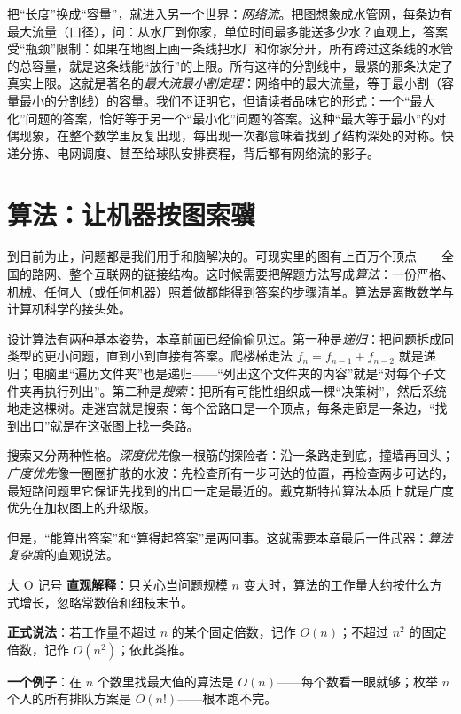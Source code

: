 把“长度”换成“容量”，就进入另一个世界：\emph{网络流}。把图想象成水管网，每条边有最大流量（口径），问：从水厂到你家，单位时间最多能送多少水？直观上，答案受“瓶颈”限制：如果在地图上画一条线把水厂和你家分开，所有跨过这条线的水管的总容量，就是这条线能“放行”的上限。所有这样的分割线中，最紧的那条决定了真实上限。这就是著名的\emph{最大流最小割定理}：网络中的最大流量，等于最小割（容量最小的分割线）的容量。我们不证明它，但请读者品味它的形式：一个“最大化”问题的答案，恰好等于另一个“最小化”问题的答案。这种“最大等于最小”的对偶现象，在整个数学里反复出现，每出现一次都意味着找到了结构深处的对称。快递分拣、电网调度、甚至给球队安排赛程，背后都有网络流的影子。

\section{算法：让机器按图索骥}

到目前为止，问题都是我们用手和脑解决的。可现实里的图有上百万个顶点——全国的路网、整个互联网的链接结构。这时候需要把解题方法写成\emph{算法}：一份严格、机械、任何人（或任何机器）照着做都能得到答案的步骤清单。算法是离散数学与计算机科学的接头处。

设计算法有两种基本姿势，本章前面已经偷偷见过。第一种是\emph{递归}：把问题拆成同类型的更小问题，直到小到直接有答案。爬楼梯走法 $f_n=f_{n-1}+f_{n-2}$ 就是递归；电脑里“遍历文件夹”也是递归——“列出这个文件夹的内容”就是“对每个子文件夹再执行列出”。第二种是\emph{搜索}：把所有可能性组织成一棵“决策树”，然后系统地走这棵树。走迷宫就是搜索：每个岔路口是一个顶点，每条走廊是一条边，“找到出口”就是在这张图上找一条路。

搜索又分两种性格。\emph{深度优先}像一根筋的探险者：沿一条路走到底，撞墙再回头；\emph{广度优先}像一圈圈扩散的水波：先检查所有一步可达的位置，再检查两步可达的，最短路问题里它保证先找到的出口一定是最近的。戴克斯特拉算法本质上就是广度优先在加权图上的升级版。

但是，“能算出答案”和“算得起答案”是两回事。这就需要本章最后一件武器：\emph{算法复杂度}的直观说法。

\begin{shuyu}{大 O 记号}
\textbf{直观解释}：只关心当问题规模 $n$ 变大时，算法的工作量大约按什么方式增长，忽略常数倍和细枝末节。

\textbf{正式说法}：若工作量不超过 $n$ 的某个固定倍数，记作 $O(n)$；不超过 $n^2$ 的固定倍数，记作 $O(n^2)$；依此类推。

\textbf{一个例子}：在 $n$ 个数里找最大值的算法是 $O(n)$——每个数看一眼就够；枚举 $n$ 个人的所有排队方案是 $O(n!)$——根本跑不完。
\end{shuyu}

